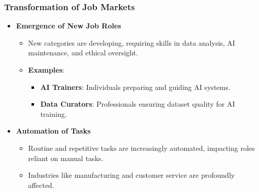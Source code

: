 \documentclass[aspectratio=169]{beamer}
\begin{document}
\begin{frame}[fragile]
    \frametitle{Transformation of Job Markets}
    \begin{itemize}
        \item \textbf{Emergence of New Job Roles}
        \begin{itemize}
            \item New categories are developing, requiring skills in data analysis, AI maintenance, and ethical oversight.
            \item \textbf{Examples}:
            \begin{itemize}
                \item \textbf{AI Trainers}: Individuals preparing and guiding AI systems.
                \item \textbf{Data Curators}: Professionals ensuring dataset quality for AI training.
            \end{itemize}
        \end{itemize}

        \item \textbf{Automation of Tasks}
        \begin{itemize}
            \item Routine and repetitive tasks are increasingly automated, impacting roles reliant on manual tasks. 
            \item Industries like manufacturing and customer service are profoundly affected.
        \end{itemize}
    \end{itemize}
\end{frame}
\end{document}
